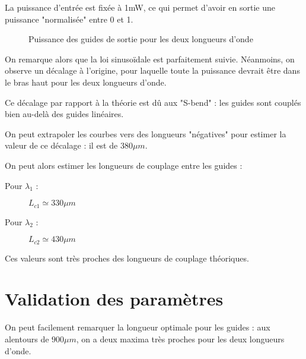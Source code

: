 \documentclass[a4paper,11pt]{report}
\begin{document}
La puissance d'entrée est fixée à 1mW, ce qui permet d'avoir en sortie une puissance "normalisée" entre 0 et 1.

\begin{figure}[h]
    \begin{center}
        \caption{Puissance des guides de sortie pour les deux longueurs d'onde}
        \label{big_graph}
    \end{center}
\end{figure}
On remarque alors que la loi sinusoïdale est parfaitement suivie. Néanmoins, on observe un décalage à l'origine, pour laquelle toute la puissance devrait être dans le bras haut pour les deux longueurs d'onde.

Ce décalage par rapport à la théorie est dû aux "S-bend" : les guides sont couplés bien au-delà des guides linéaires.

On peut extrapoler les courbes vers des longueurs "négatives" pour estimer la valeur de ce décalage : il est de $380\mu m$.

On peut alors estimer les longueurs de couplage entre les guides :
\begin{description}
    \item[Pour $\lambda_1$ :] $L_{c1} \simeq 330\mu m$
    \item[Pour $\lambda_2$ :] $L_{c2} \simeq 430\mu m $
\end{description}

Ces valeurs sont très proches des longueurs de couplage théoriques.


\section{Validation des paramètres}
On peut facilement remarquer la longueur optimale pour les guides : aux alentours de $900\mu m$, on a deux maxima très proches pour les deux longueurs d'onde.
\end{document}
